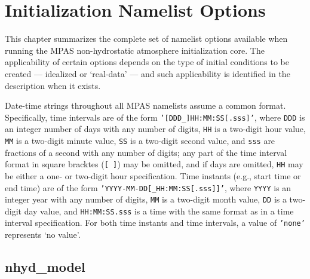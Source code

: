 
\chapter{Initialization Namelist Options}

This chapter summarizes the complete set of namelist options available when
running the MPAS non-hydrostatic atmosphere initialization core.  The
applicability of certain options depends on the type of initial conditions to be
created --- idealized or `real-data' --- and such applicability is identified in
the description when it exists.

Date-time strings throughout all MPAS namelists assume a common format.
Specifically, time intervals are of the form {\tt '[DDD\_]HH:MM:SS[.sss]'},
where {\tt DDD} is an integer number of days with any number of digits, {\tt HH}
is a two-digit hour value, {\tt MM} is a two-digit minute value, {\tt SS} is a
two-digit second value, and {\tt sss} are fractions of a second with any number
of digits; any part of the time interval format in square bracktes ({\tt [ ]})
may be omitted, and if days are omitted, {\tt HH} may be either a one- or
two-digit hour specification.  Time instants (e.g., start time or end time) are
of the form {\tt 'YYYY-MM-DD[\_HH:MM:SS[.sss]]'}, where {\tt YYYY} is an integer
year with any number of digits, {\tt MM} is a two-digit month value, {\tt DD} is
a two-digit day value, and {\tt HH:MM:SS.sss} is a time with the same format as
in a time interval specification. For both time instants and time intervals, a
value of {\tt 'none'} represents `no value'.

\section{nhyd\_model}

